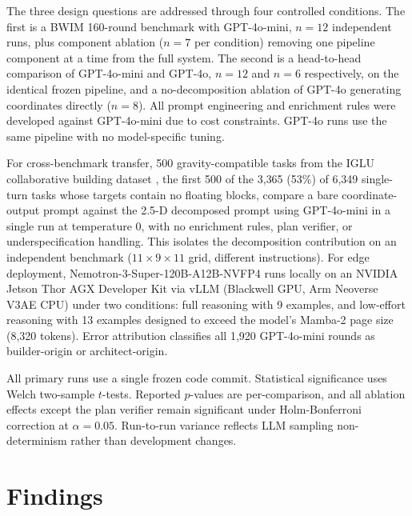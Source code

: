 \documentclass[10pt]{article}
\begin{document}
The three design questions are addressed through four controlled
conditions. The first is a BWIM 160-round benchmark with GPT-4o-mini,
$n = 12$ independent runs, plus component ablation ($n = 7$ per condition)
removing one pipeline component at a time from the full system. The second
is a head-to-head comparison of GPT-4o-mini and GPT-4o, $n = 12$ and
$n = 6$ respectively, on the identical frozen pipeline, and a
no-decomposition ablation of GPT-4o generating coordinates directly
($n = 8$). All prompt
engineering and enrichment rules were developed against GPT-4o-mini due to
cost constraints. GPT-4o runs use the same pipeline with no model-specific
tuning.

For cross-benchmark transfer, 500 gravity-compatible tasks from the IGLU
collaborative building dataset \parencite{iglu2022}, the first 500 of the
3{,}365 (53\%) of 6{,}349 single-turn tasks whose targets contain no
floating blocks, compare a bare
coordinate-output prompt against the 2.5-D decomposed prompt using
GPT-4o-mini in a single run at temperature 0, with no enrichment rules, plan verifier, or
underspecification handling. This isolates the decomposition contribution
on an independent benchmark ($11 \times 9 \times 11$ grid, different
instructions). For edge deployment,
Nemotron-3-Super-120B-A12B-NVFP4 \parencite{nemotron2026} runs locally on
an NVIDIA Jetson Thor AGX Developer Kit \parencite{jetsonthor} via
vLLM \parencite{vllm2023} (Blackwell GPU, Arm Neoverse V3AE CPU) under two
conditions: full reasoning with 9 examples, and low-effort reasoning with
13 examples designed to exceed the model's Mamba-2 page size (8,320 tokens). Error attribution classifies all 1,920 GPT-4o-mini rounds as
builder-origin or architect-origin.

All primary runs use a single frozen code commit. Statistical significance
uses Welch two-sample $t$-tests. Reported $p$-values are per-comparison, and
all ablation effects except the plan verifier remain significant under
Holm-Bonferroni correction at $\alpha = 0.05$. Run-to-run variance reflects LLM
sampling non-determinism rather than development changes.

\section{Findings}
\label{sec:findings}
\end{document}
